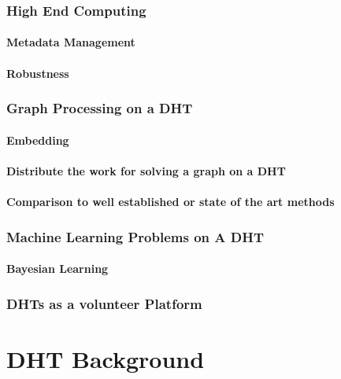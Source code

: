 \documentclass[10pt,letterpaper]{report}
\begin{document}
\subsection{High End Computing}
\subsubsection{Metadata Management}
\subsubsection{Robustness}

\subsection{Graph Processing on a DHT}
\subsubsection{Embedding}
\subsubsection{Distribute the work for solving a graph on a DHT}
\subsubsection{Comparison to well established or state of the art methods}

\subsection{Machine Learning Problems on A DHT}
\subsubsection{Bayesian Learning}

\subsection{DHTs as a volunteer Platform}

\chapter{DHT Background}





\end{document}
